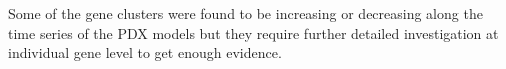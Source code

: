 Some of the gene clusters were found to be increasing or decreasing along the time series of the PDX models but they require further detailed investigation at individual gene level to get enough evidence.




















